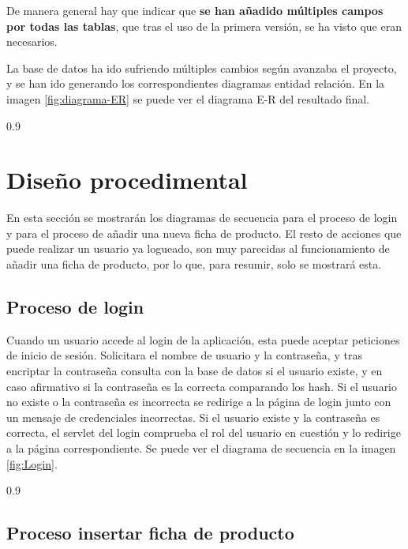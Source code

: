 De manera general hay que indicar que \textbf{se han añadido múltiples campos por todas las tablas}, que tras el uso de la primera versión, se ha visto que eran necesarios.

La base de datos ha ido sufriendo múltiples cambios según avanzaba el proyecto, y se han ido generando los correspondientes diagramas entidad relación. En la imagen \ref{fig:diagrama-ER} se puede ver el diagrama E-R del resultado final.

 {0.9}

\section{Diseño procedimental}

En esta sección se mostrarán los diagramas de secuencia para el proceso de login y para el proceso de añadir una nueva ficha de producto. El resto de acciones que puede realizar un usuario ya logueado, son muy  parecidas al funcionamiento de añadir una ficha de producto, por lo que, para resumir, solo se mostrará esta. 

\subsection{Proceso de login}

Cuando un usuario accede al login de la aplicación, esta puede aceptar peticiones de inicio de sesión. Solicitara el nombre de usuario y la contraseña, y tras encriptar la contraseña consulta con la base de datos si el usuario existe, y en caso afirmativo si la contraseña es la correcta comparando los hash. Si el usuario no existe o la contraseña es incorrecta se redirige a la página de login junto con un mensaje de credenciales incorrectas. Si el usuario existe y la contraseña es correcta, el servlet del login comprueba el rol del usuario en cuestión y lo redirige a la página correspondiente. Se puede ver el diagrama  de secuencia en la imagen \ref{fig:Login}.

 {0.9}


\subsection{Proceso insertar ficha de producto}

